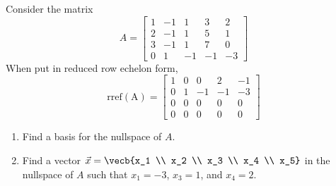 \begin{Exercise}[title={Finding a Basis for a Nullspace}, label={nullspace1}]

Consider the matrix 
\[A=
\begin{bmatrix}
1 & -1 & 1 & 3 & 2\\
2 & -1 & 1 & 5 & 1\\
3 & -1 & 1 & 7 & 0\\
0 & 1 & -1 & -1 & -3 
\end{bmatrix}
\]
When put in reduced row echelon form,
\[\operatorname{rref(A)}=
\begin{bmatrix}
1 & 0 & 0 & 2 & -1\\
0 & 1 & -1 & -1 & -3 \\
0 & 0 & 0 & 0 & 0\\
0 & 0 & 0 & 0 & 0
\end{bmatrix}
\]

\begin{enumerate}[label=\alph*]
    \item Find a basis for the nullspace of $A$.
    \item Find a vector $\vec{x} = \vecb{x_1 \\ x_2 \\ x_3 \\ x_4 \\ x_5}$ in the nullspace of $A$ such that $x_1 = -3$, $x_3=1$, and $x_4 = 2$. 
\end{enumerate}
\end{Exercise}
